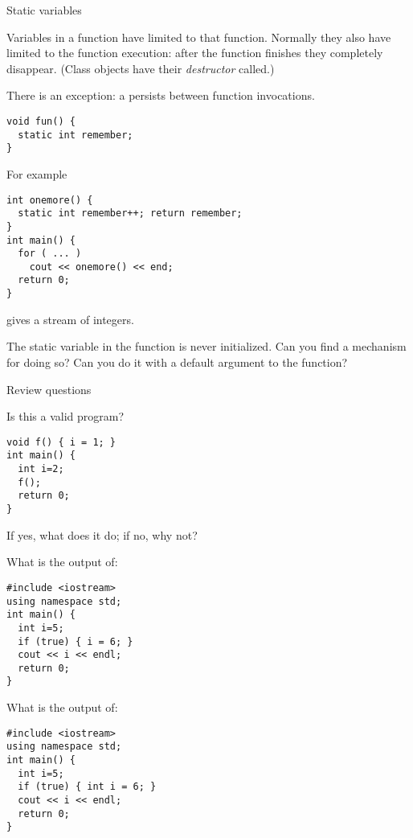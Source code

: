  {Static variables}
\label{sec:static-scope}

Variables in a function have  limited to
that function. Normally they also have 
limited to the function execution: after the function finishes they
completely disappear. (Class objects have their
%
\emph{destructor}
called.)

There is an exception: a  persists
between function invocations.
\begin{verbatim}
void fun() {
  static int remember;
}
\end{verbatim}
For example
\begin{verbatim}
int onemore() {
  static int remember++; return remember;
}
int main() {
  for ( ... )
    cout << onemore() << end;
  return 0;
}
\end{verbatim}
gives a stream of integers.
\begin{exercise}
  The static variable in the  function is never
  initialized. Can you find a mechanism for doing so?
  Can you do it with a default argument to the function?
\end{exercise}

 {Review questions}

\begin{exercise}
  \label{ex:cpp-scope1}
  Is this a valid program?
\begin{verbatim}
void f() { i = 1; }
int main() {
  int i=2;
  f();
  return 0;
}
\end{verbatim}
If yes, what does it do; if no, why not?
\end{exercise}

\begin{exercise}
  \label{ex:cpp-scope2}
  What is the output of:
\begin{verbatim}
#include <iostream>
using namespace std;
int main() {
  int i=5;
  if (true) { i = 6; }
  cout << i << endl;
  return 0;
}
\end{verbatim}
\end{exercise}

\begin{exercise}
  \label{ex:cpp-scope3}
  What is the output of:
\begin{verbatim}
#include <iostream>
using namespace std;
int main() {
  int i=5;
  if (true) { int i = 6; }
  cout << i << endl;
  return 0;
}
\end{verbatim}
\end{exercise}

